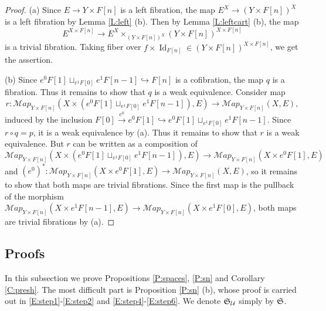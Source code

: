 \documentclass[12pt]{amsart}
\theoremstyle{plain}
\theoremstyle{definition}
\numberwithin{equation}{section}
\newcommand{\cal}[1]{\mathcal{#1}}
\newcommand{\C}[1]{\cal#1}
\newcommand{\lra}{\longrightarrow}
\newcommand{\hra}{\hookrightarrow}
\newcommand{\rl}[1]{Lemma \ref{L:#1}}
\newcommand{\rp}[1]{Proposition \ref{P:#1}}
\newcommand{\re}[1]{\ref{E:#1}}
\newcommand{\rco}[1]{Corollary \ref{C:#1}}
\newcommand{\Id}{\operatorname{Id}}
\renewcommand{\S}{\frak{S}}
\begin{document}
\begin{proof}
(a) Since $E\to Y\times F[n]$ is a left fibration, the map $E^X\to
(Y\times F[n])^X$ is a left fibration by \rl{left} (b). Then by
\rl{leftcart} (b), the map
\[
E^{X\times F[n]}\to E^X\times_{(Y\times F[n])^X}(Y\times
F[n])^{X\times F[n]}
\]
is a trivial fibration. Taking fiber over $f\times\Id_{F[n]}\in
(Y\times F[n])^{X\times F[n]}$, we get the assertion.

(b) Since $e^0 F[1]\sqcup_{e^1 F[0]}e^1 F[n-1]\hra F[n]$ is a
cofibration, the map $q$ is a fibration. Thus it remains to show
that $q$ is a weak equivalence. Consider map
\[
r:\C{Map}_{Y\times F[n]}(X\times (e^0F[1]\sqcup_{e^1F[0]}e^1
F[n-1]),E)\to \C{Map}_{Y\times F[n]}(X,E),
\]
induced by the inclusion $F[0]\overset{e^0}{\lra} e^0 F[1]\hra e^0
F[1]\sqcup_{e^1 F[0]}e^1 F[n-1]$. Since $r\circ q=p$, it is a weak
equivalence by (a). Thus it remains to show that $r$ is a weak
equivalence. But $r$ can be written as a composition of
\[
\C{Map}_{Y\times F[n]}(X\times (e^0F[1]\sqcup_{e^1 F[0]}e^1
F[n-1]),E)\to \C{Map}_{Y\times F[n]}(X\times e^0F[1],E)
\]
and $(e^0)^*:\C{Map}_{Y\times F[n]}(X\times e^0 F[1],E)\to \C{Map}_{Y\times
F[n]}(X,E)$, so it remains to show that both maps are trivial
fibrations. Since the first map is the pullback of the morphism
$\C{Map}_{Y\times F[n]}(X\times e^1 F[n-1],E)\to \C{Map}_{Y\times
F[n]}(X\times e^1 F[0],E)$, both maps are trivial fibrations by
(a).
\end{proof}






\subsection{Proofs} In this subsection we prove Propositions \ref{P:spaces}, 
\ref{P:sn} and \rco{presh}. The most difficult part is \rp{sn} (b), whose proof 
is carried out in \re{step1}-\re{step2} and \re{step4}-\re{step6}.  
We denote $\S_{\C{U}}$ simply by $\S$.
\end{document}
